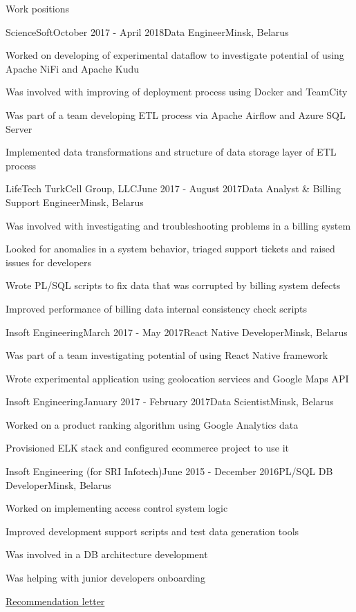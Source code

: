 \documentclass{resume} %
\begin{document}
\begin{rSection}{Work positions}
\begin{rSubsection}{ScienceSoft}{October 2017 - April 2018}{Data Engineer}{Minsk, Belarus}
\item Worked on developing of experimental dataflow to investigate potential of using Apache NiFi and Apache Kudu
\item Was involved with improving of deployment process using Docker and TeamCity
\item Was part of a team developing ETL process via Apache Airflow and Azure SQL Server
\item Implemented data transformations and structure of data storage layer of ETL process
\end{rSubsection}

\begin{rSubsection}{LifeTech TurkCell Group, LLC}{June 2017 - August 2017}{Data Analyst \& Billing Support Engineer}{Minsk, Belarus}
\item Was involved with investigating and troubleshooting problems in a billing system
\item Looked for anomalies in a system behavior, triaged support tickets and raised issues for developers
\item Wrote PL/SQL scripts to fix data that was corrupted by billing system defects
\item Improved performance of billing data internal consistency check scripts
\end{rSubsection}

\begin{rSubsection}{Insoft Engineering}{March 2017 - May 2017}{React Native Developer}{Minsk, Belarus}
\item Was part of a team investigating potential of using React Native framework
\item Wrote experimental application using geolocation services and Google Maps API
\end{rSubsection}

\begin{rSubsection}{Insoft Engineering}{January 2017 - February 2017}{Data Scientist}{Minsk, Belarus}
\item Worked on a product ranking algorithm using Google Analytics data
\item Provisioned ELK stack and configured ecommerce project to use it
\end{rSubsection}

\begin{rSubsection}{Insoft Engineering (for SRI Infotech)}{June 2015 - December 2016}{PL/SQL DB Developer}{Minsk, Belarus}
\item Worked on implementing access control system logic
\item Improved development support scripts and test data generation tools
\item Was involved in a DB architecture development
\item Was helping with junior developers onboarding
\item \href{https://drive.google.com/file/d/0B256DYrZGsaVZHZJb3FMQ01hVHM/view?resourcekey=0-4UN7Vrmp5Lz1ul89orouGA}{Recommendation letter}
\end{rSubsection}


\end{rSection}
\end{document}
